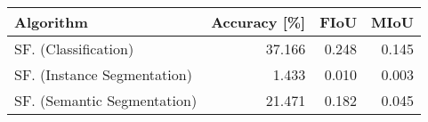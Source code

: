 \begin{tabular}{lrrr}
\toprule
Algorithm  &  Accuracy [\%] &  FIoU &  MIoU \\
\midrule
SF. (Classification)&        37.166 & 0.248 & 0.145 \\
SF. (Instance Segmentation)&         1.433 & 0.010 & 0.003 \\
SF. (Semantic Segmentation)&        21.471 & 0.182 & 0.045 \\
\bottomrule
\end{tabular}

